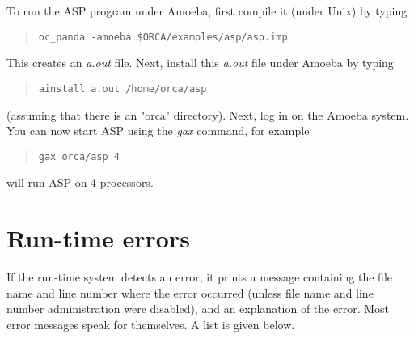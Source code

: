 \documentclass[10pt]{article}
\begin{document}
To run the ASP
program under Amoeba, first compile it (under Unix) by typing
\begin{quote}
\begin{verbatim}
oc_panda -amoeba $ORCA/examples/asp/asp.imp
\end{verbatim}
\end{quote}
This creates an {\em a.out} file.
Next, install this {\em a.out} file under Amoeba by typing
\begin{quote}
\begin{verbatim}
ainstall a.out /home/orca/asp
\end{verbatim}
\end{quote}
(assuming that there is an "orca" directory).
Next, log in on the Amoeba system.
You can now start ASP using the
{\em gax}
command, for example
\begin{quote}
\begin{verbatim}
gax orca/asp 4
\end{verbatim}
\end{quote}
will run ASP on 4 processors.

\section{Run-time errors}\label{sec:errors}

If the run-time system detects an error, it prints a message
containing the file name and line number where the error occurred
(unless file name and line number administration were disabled),
and an explanation of the error.
Most error messages speak for themselves.
A list is given below.
\end{document}
